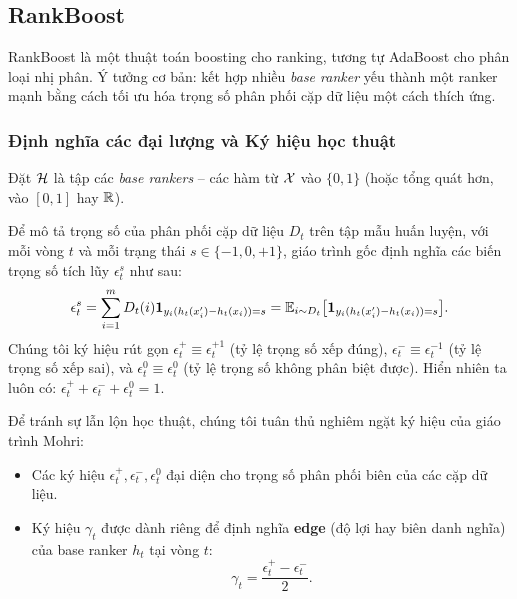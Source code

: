 \subsection{RankBoost}
\label{sec:rankboost}

RankBoost \citep{freund2003efficient} là một thuật toán boosting cho ranking,
tương tự AdaBoost cho phân loại nhị phân. Ý tưởng cơ bản: kết hợp nhiều
\textit{base ranker} yếu thành một ranker mạnh bằng cách tối ưu hóa trọng số phân phối cặp dữ liệu một cách thích ứng.

\subsubsection{Định nghĩa các đại lượng và Ký hiệu học thuật}

Đặt $\mathcal{H}$ là tập các \textit{base rankers} -- các hàm từ $\mathcal{X}$ vào $\{0, 1\}$ (hoặc tổng quát hơn, vào $[0, 1]$ hay $\mathbb{R}$).

Để mô tả trọng số của phân phối cặp dữ liệu $D_t$ trên tập mẫu huấn luyện, với mỗi vòng $t$ và mỗi trạng thái $s \in \{-1, 0, +1\}$, giáo trình gốc \citep{mohri2018foundations} định nghĩa các biến trọng số tích lũy $\epsilon^s_t$ như sau:
\begin{equation}
    \epsilon^s_t = \sum_{i=1}^m D_t(i) \mathbf{1}_{y_i(h_t(x'_i) - h_t(x_i)) = s}
    = \mathbb{E}_{i \sim D_t}\bigl[\mathbf{1}_{y_i(h_t(x'_i) - h_t(x_i)) = s}\bigr].
    \label{eq:epsilon_def}
\end{equation}
Chúng tôi ký hiệu rút gọn $\epsilon^+_t \equiv \epsilon^{+1}_t$ (tỷ lệ trọng số xếp đúng), $\epsilon^-_t \equiv \epsilon^{-1}_t$ (tỷ lệ trọng số xếp sai), và $\epsilon^0_t \equiv \epsilon^0_t$ (tỷ lệ trọng số không phân biệt được). Hiển nhiên ta luôn có: $\epsilon^+_t + \epsilon^-_t + \epsilon^0_t = 1$.

Để tránh sự lẫn lộn học thuật, chúng tôi tuân thủ nghiêm ngặt ký hiệu của giáo trình Mohri:
\begin{itemize}
    \item Các ký hiệu $\epsilon^+_t, \epsilon^-_t, \epsilon^0_t$ đại diện cho trọng số phân phối biên của các cặp dữ liệu.
    \item Ký hiệu $\gamma_t$ được dành riêng để định nghĩa \textbf{edge} (độ lợi hay biên danh nghĩa) của base ranker $h_t$ tại vòng $t$:
    \begin{equation}
        \gamma_t = \frac{\epsilon^+_t - \epsilon^-_t}{2}.
        \label{eq:edge_def}
    \end{equation}
\end{itemize}

